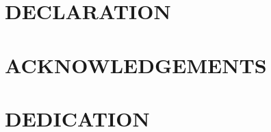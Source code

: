 \chapter*{DECLARATION}
%
%
%
%
%


\newpage

\chapter*{ACKNOWLEDGEMENTS}

%
\chapter*{DEDICATION} 

